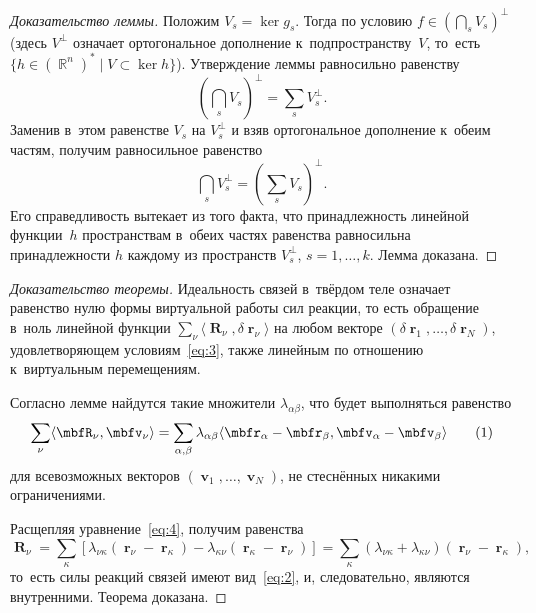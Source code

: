 \documentclass[a4paper,11pt,draft]{article}
\newcommand\eqtag[1]{\refstepcounter{equation}\tag{\theequation}\label{#1}}
\theoremstyle{definition}
\begin{document}
\begin{proof}[Доказательство леммы]
Положим $V_s=\ker g_s$. Тогда по условию $f\in(\bigcap_sV_s)^\perp$ (здесь
$V^\perp$ означает ортогональное дополнение к~подпространству~$V$, то~есть
$\{h\in(\BbbR^n)^*\mid V\subset\ker h\}$). Утверждение леммы равносильно
равенству
	\[
	\left(\bigcap_sV_s\right)^\perp=\sum_sV_s^\perp.
	\]
Заменив в~этом равенстве $V_s$ на $V_s^\perp$ и взяв ортогональное дополнение
к~обеим частям, получим равносильное равенство
	\[
	\bigcap_sV_s^\perp=\left(\sum_sV_s\right)^\perp.
	\]
Его справедливость вытекает из того факта, что
принадлежность линейной функции~$h$ пространствам в~обеих частях равенства
равносильна принадлежности $h$ каждому из пространств $V_s^\perp$,
$s=1,\ldots,k$. Лемма доказана.
%
\end{proof}

\begin{proof}[Доказательство теоремы]
Идеальность связей в~твёрдом теле означает равенство нулю формы виртуальной
работы сил реакции, то есть обращение в~ноль линейной функции
$\sum_\nu\langle\mbfR_\nu,\delta\mbfr_\nu\rangle$ на любом векторе
$(\delta\mbfr_1,\ldots,\delta\mbfr_N)$, удовлетворяющем условиям~\eqref{eq:3},
также линейным по отношению к~виртуальным перемещениям.

Согласно лемме найдутся такие множители $\lambda_{\alpha\beta}$, что будет
выполняться равенство
	\[
	\sum_\nu\langle\mbfR_\nu,\mbfv_\nu\rangle
		=\sum_{\alpha,\beta}\lambda_{\alpha\beta}
		\langle\mbfr_\alpha-\mbfr_\beta,\mbfv_\alpha-\mbfv_\beta\rangle
	\eqtag{eq:4}
	\]
для всевозможных векторов $(\mbfv_1,\ldots,\mbfv_N)$, не стеснённых никакими
ограничениями.

Расщепляя уравнение~\eqref{eq:4}, получим равенства
	\[
	\mbfR_\nu=\sum_\kappa[\lambda_{\nu\kappa}(\mbfr_\nu-\mbfr_\kappa)
		-\lambda_{\kappa\nu}(\mbfr_\kappa-\mbfr_\nu)]
		=\sum_\kappa(\lambda_{\nu\kappa}+\lambda_{\kappa\nu})(\mbfr_\nu-\mbfr_\kappa),
	\]
то~есть силы реакций связей имеют вид~\eqref{eq:2}, и, следовательно, являются
внутренними. Теорема доказана.
\end{proof}
\end{document}
